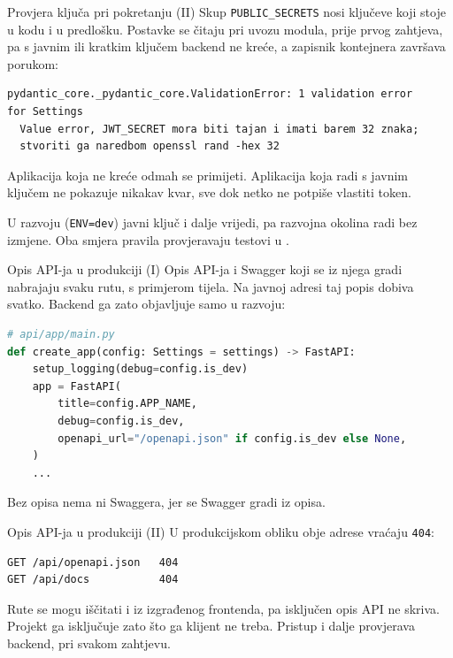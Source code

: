 \begin{frame}[fragile]{Provjera ključa pri pokretanju (II)}
Skup \texttt{PUBLIC\_SECRETS} nosi ključeve koji stoje u kodu i u predlošku. Postavke se čitaju pri uvozu modula, prije prvog zahtjeva, pa s javnim ili kratkim ključem backend ne kreće, a zapisnik kontejnera završava porukom:

\begin{lstlisting}
pydantic_core._pydantic_core.ValidationError: 1 validation error
for Settings
  Value error, JWT_SECRET mora biti tajan i imati barem 32 znaka;
  stvoriti ga naredbom openssl rand -hex 32
\end{lstlisting}

\vspace{0.4em}
Aplikacija koja ne kreće odmah se primijeti. Aplikacija koja radi s javnim ključem ne pokazuje nikakav kvar, sve dok netko ne potpiše vlastiti token.

\vspace{0.4em}
U razvoju (\texttt{ENV=dev}) javni ključ i dalje vrijedi, pa razvojna okolina radi bez izmjene. Oba smjera pravila provjeravaju testovi u .
\end{frame}

\begin{frame}[fragile]{Opis API-ja u produkciji (I)}
Opis API-ja i Swagger koji se iz njega gradi nabrajaju svaku rutu, s primjerom tijela. Na javnoj adresi taj popis dobiva svatko. Backend ga zato objavljuje samo u razvoju:

\begin{lstlisting}[language=python]
# api/app/main.py
def create_app(config: Settings = settings) -> FastAPI:
    setup_logging(debug=config.is_dev)
    app = FastAPI(
        title=config.APP_NAME,
        debug=config.is_dev,
        openapi_url="/openapi.json" if config.is_dev else None,
    )
    ...
\end{lstlisting}

\vspace{0.2em}
Bez opisa nema ni Swaggera, jer se Swagger gradi iz opisa.
\end{frame}

\begin{frame}[fragile]{Opis API-ja u produkciji (II)}
U produkcijskom obliku obje adrese vraćaju \texttt{404}:

\begin{lstlisting}
GET /api/openapi.json   404
GET /api/docs           404
\end{lstlisting}

\vspace{0.6em}
\begin{konvencija}
Rute se mogu iščitati i iz izgrađenog frontenda, pa isključen opis API ne skriva. Projekt ga isključuje zato što ga klijent ne treba. Pristup i dalje provjerava backend, pri svakom zahtjevu.
\end{konvencija}
\end{frame}

